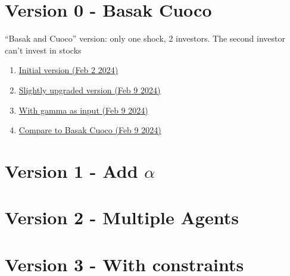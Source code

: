 \documentclass[12pt,english]{article}
\date{}
\begin{document}
\onehalfspacing	

\section*{Version 0 - Basak Cuoco}
``Basak and Cuoco'' version: only one shock, 2 investors. The second investor can't invest in stocks

\begin{enumerate}
    \item \href{https://colab.research.google.com/drive/1Xj-eAKejTl3qtn0EAsPv2ODnk9uLxifL?usp=sharing}{Initial version (Feb 2 2024)}
    \item \href{https://colab.research.google.com/drive/1zKrZcQTCJGVCyYHx3zfPJOpd1Qm1USgO?usp=sharing}{Slightly upgraded version (Feb 9 2024)}

    \item \href{https://colab.research.google.com/drive/1LzmC0mSWE5VYL1Tdmw9coDXE0gLJ7Ncr?usp=sharing}{With gamma as input (Feb 9 2024)}

    \item \href{https://colab.research.google.com/drive/15fMq_O2jo1scvzDIsJQca8AoQ4_ZCy_L?usp=sharing}{Compare to Basak Cuoco (Feb 9 2024)}
\end{enumerate}

\section*{Version 1 - Add $\alpha$}

\section*{Version 2 - Multiple Agents}

\section*{Version 3 - With constraints}

    
\end{document}
